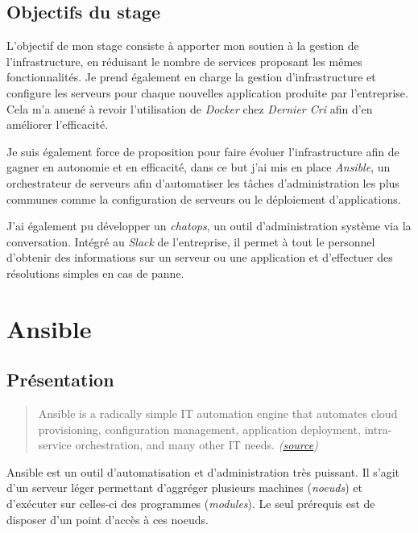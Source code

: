 \newpage

\subsection{Objectifs du stage}\label{objectifs-du-stage}

L'objectif de mon stage consiste à apporter mon soutien à la gestion de
l'infrastructure, en réduisant le nombre de services proposant les mêmes
fonctionnalités. Je prend également en charge la gestion
d'infrastructure et configure les serveurs pour chaque nouvelles
application produite par l'entreprise. Cela m'a amené à revoir
l'utilisation de \emph{Docker} chez \emph{Dernier Cri} afin d'en
améliorer l'efficacité.

\bigskip

Je suis également force de proposition pour faire évoluer
l'infrastructure afin de gagner en autonomie et en efficacité, dans ce
but j'ai mis en place \emph{Ansible}, un orchestrateur de serveurs afin
d'automatiser les tâches d'administration les plus communes comme la
configuration de serveurs ou le déploiement d'applications.

\bigskip

J'ai également pu développer un \emph{chatops}, un outil
d'administration système via la conversation. Intégré au \emph{Slack} de
l'entreprise, il permet à tout le personnel d'obtenir des informations
sur un serveur ou une application et d'effectuer des résolutions simples
en cas de panne.

\newpage

\section{Ansible}\label{ansible}

\subsection{Présentation}\label{pruxe9sentation}

\begin{quote}
Ansible is a radically simple IT automation engine that automates cloud
provisioning, configuration management, application deployment,
intra-service orchestration, and many other IT needs.
\emph{(\href{https://www.ansible.com/how-ansible-works}{source})}
\end{quote}

\bigskip
Ansible est un outil d'automatisation et d'administration très puissant.
Il s'agit d'un serveur léger permettant d'aggréger plusieurs machines
(\emph{noeuds}) et d'exécuter sur celles-ci des programmes
(\emph{modules}). Le seul prérequis est de disposer d'un point d'accès à
ces noeuds.

